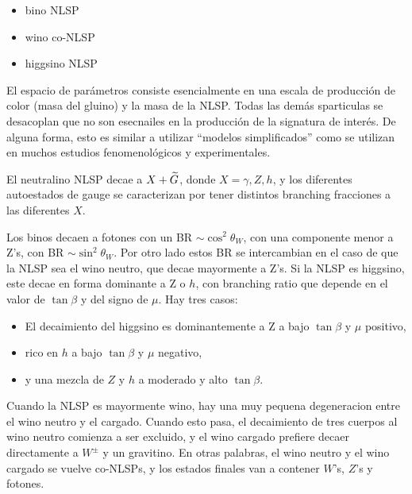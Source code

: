 \begin{itemize}
\item bino NLSP
\item wino co-NLSP
\item higgsino NLSP
\end{itemize}


El espacio de parámetros consiste esencialmente en una escala de producción de color (masa del gluino)
y la masa de la NLSP. Todas las demás sparticulas se desacoplan que no son esecnailes en la producción
de la signatura de interés. De alguna forma, esto es similar a utilizar ``modelos simplificados'' como
se utilizan en muchos estudios fenomenológicos y experimentales. 

El neutralino NLSP decae a $X + \widetilde{G}$, donde $X=\gamma, Z, h$, y los diferentes autoestados de gauge
se caracterizan por tener distintos branching fracciones a las diferentes $X$.


Los binos decaen a fotones con un BR $\sim \cos^2\theta_W$, con una componente menor a Z's, con
BR $\sim \sin^2\theta_W$.
Por otro lado estos BR se intercambian en el caso de que la NLSP sea el wino neutro, que decae
mayormente a Z's.
Si la NLSP es higgsino, este decae en forma dominante a Z o $h$, con branching ratio que depende
en el valor de $\tan\beta$ y del signo de $\mu$. Hay tres casos:

\begin{itemize}
\item El decaimiento del higgsino es dominantemente a Z a bajo $\tan\beta$ y $\mu$ positivo,
\item rico en $h$ a bajo $\tan\beta$ y $\mu$ negativo,
\item y una mezcla de $Z$ y $h$ a moderado y alto $\tan\beta$.
\end{itemize}

Cuando la NLSP es mayormente wino, hay una muy pequena degeneracion entre el wino neutro y el
cargado. Cuando esto pasa, el decaimiento de tres cuerpos al wino neutro comienza
a ser excluido, y el wino cargado prefiere decaer directamente a $W^{\pm}$ y un gravitino.
En otras palabras, el wino neutro y el wino cargado se vuelve co-NLSPs, y los estados finales van
a contener $W$'s, $Z$'s y fotones.

